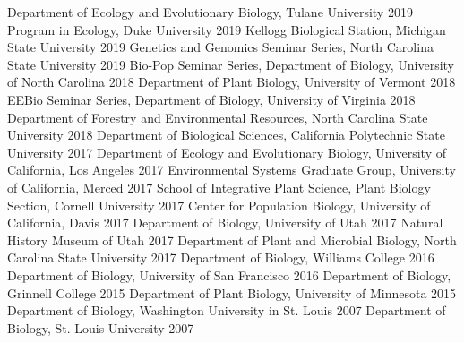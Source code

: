 \documentclass[11pt,english]{article}\usepackage[]{graphicx}\usepackage[]{xcolor}
\begin{document}
Department of Ecology and Evolutionary Biology, Tulane University \hfill {2019} \newline
Program in Ecology, Duke University \hfill {2019}\newline
Kellogg Biological Station, Michigan State University \hfill {2019} \newline
Genetics and Genomics Seminar Series, North Carolina State University \hfill {2019} \newline
Bio-Pop Seminar Series, Department of Biology, University of North Carolina \hfill {2018} \newline
Department of Plant Biology, University of Vermont \hfill {2018} \newline
EEBio Seminar Series, Department of Biology, University of Virginia \hfill {2018} \newline
Department of Forestry and Environmental Resources, North Carolina State University \hfill {2018} \newline
Department of Biological Sciences, California Polytechnic State University \hfill {2017} \newline
Department of Ecology and Evolutionary Biology, University of California, Los Angeles \hfill {2017} \newline
Environmental Systems Graduate Group, University of California, Merced \hfill {2017} \newline
School of Integrative Plant Science, Plant Biology Section, Cornell University \hfill {2017} \newline
Center for Population Biology, University of California, Davis \hfill {2017} \newline
Department of Biology, University of Utah \hfill {2017} \newline
Natural History Museum of Utah \hfill {2017} \newline
Department of Plant and Microbial Biology, North Carolina State University \hfill {2017} \newline
Department of Biology, Williams College \hfill {2016} \newline
Department of Biology, University of San Francisco \hfill {2016} \newline
Department of Biology, Grinnell College \hfill {2015} \newline
Department of Plant Biology, University of Minnesota \hfill {2015} \newline
Department of Biology, Washington University in St. Louis \hfill {2007} \newline
Department of Biology, St. Louis University \hfill {2007} \newline
\vspace{-2ex}
\end{document}

